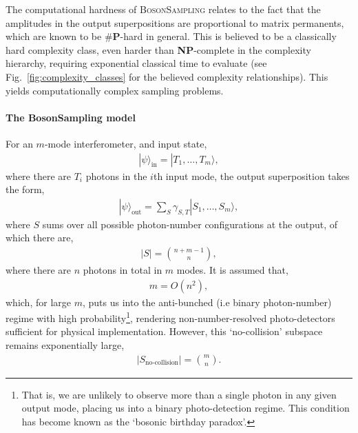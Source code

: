 \documentclass[aps, rmp, twocolumn, amsmath, amssymb, nofootinbib, superscriptaddress, longbibliography, floatfix, table-of-contents, eqsecnum]{revtex4-1}
\newcommand{\ket}[1]{|#1\rangle}
\begin{document}
The computational hardness of \textsc{BosonSampling} relates to the fact that the amplitudes in the output superpositions are proportional to matrix permanents, which are known to be \#\textbf{P}-hard in general. This is believed to be a classically hard complexity class, even harder than \textbf{NP}-complete in the complexity hierarchy, requiring exponential classical time to evaluate (see Fig.~\ref{fig:complexity_classes} for the believed complexity relationships). This yields computationally complex sampling problems.

%
%

\paragraph{The {\sc BosonSampling} model} 

For an $m$-mode interferometer, and input state,
\begin{align}
\ket\psi_\text{in} = \ket{T_1,\dots,T_m},
\end{align}
where there are $T_i$ photons in the $i$th input mode, the output superposition takes the form,
\begin{align}
\ket\psi_\text{out} = \sum_S \gamma_{S,T} \ket{S_1,\dots,S_m},
\end{align}
where $S$ sums over all possible photon-number configurations at the output, of which there are,
\begin{align}
|S| = \binom{n+m-1}{n},
\end{align}
where there are $n$ photons in total in $m$ modes. It is assumed that,
\begin{align}
m=O(n^2),
\end{align}
which, for large $m$, puts us into the anti-bunched (i.e binary photon-number) regime with high probability\footnote{That is, we are unlikely to observe more than a single photon in any given output mode, placing us into a binary photo-detection regime. This condition has become known as the `bosonic birthday paradox'.}, rendering non-number-resolved photo-detectors sufficient for physical implementation. However, this `no-collision' subspace remains exponentially large,
\begin{align}
|S_\text{no-collision}| = \binom{m}{n}.
\end{align}
\end{document}
